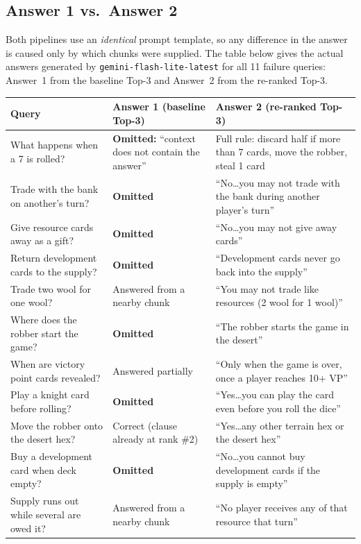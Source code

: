\documentclass[11pt]{article}
\newcommand{\code}[1]{\texttt{#1}}
\begin{document}
\subsection{Answer 1 vs.\ Answer 2}
Both pipelines use an \emph{identical} prompt template, so any difference in the answer is caused only
by which chunks were supplied. The table below gives the actual answers generated by
\code{gemini-flash-lite-latest} for all 11 failure queries: Answer~1 from the baseline Top-3 and
Answer~2 from the re-ranked Top-3.

\begin{center}
\footnotesize
\begin{tabular}{@{}L{3.5cm} L{3.9cm} L{5.4cm}@{}}
\toprule
\textbf{Query} & \textbf{Answer 1 (baseline Top-3)} & \textbf{Answer 2 (re-ranked Top-3)} \\
\midrule
What happens when a 7 is rolled? & \textbf{Omitted:} ``context does not contain the answer'' & Full rule: discard half if more than 7 cards, move the robber, steal 1 card \\
\addlinespace
Trade with the bank on another's turn? & \textbf{Omitted} & ``No\dots you may not trade with the bank during another player's turn'' \\
\addlinespace
Give resource cards away as a gift? & \textbf{Omitted} & ``No\dots you may not give away cards'' \\
\addlinespace
Return development cards to the supply? & \textbf{Omitted} & ``Development cards never go back into the supply'' \\
\addlinespace
Trade two wool for one wool? & Answered from a nearby chunk & ``You may not trade like resources (2 wool for 1 wool)'' \\
\addlinespace
Where does the robber start the game? & \textbf{Omitted} & ``The robber starts the game in the desert'' \\
\addlinespace
When are victory point cards revealed? & Answered partially & ``Only when the game is over, once a player reaches 10+ VP'' \\
\addlinespace
Play a knight card before rolling? & \textbf{Omitted} & ``Yes\dots you can play the card even before you roll the dice'' \\
\addlinespace
Move the robber onto the desert hex? & Correct (clause already at rank \#2) & ``Yes\dots any other terrain hex or the desert hex'' \\
\addlinespace
Buy a development card when deck empty? & \textbf{Omitted} & ``No\dots you cannot buy development cards if the supply is empty'' \\
\addlinespace
Supply runs out while several are owed it? & Answered from a nearby chunk & ``No player receives any of that resource that turn'' \\
\bottomrule
\end{tabular}
\end{center}
\end{document}
